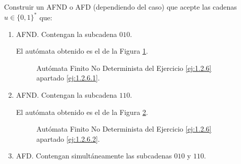 \begin{ejercicio} \label{ej:1.2.6}
    Construir un AFND o AFD (dependiendo del caso) que acepte las cadenas $u \in \{0, 1\}^*$ que:
    \begin{enumerate}
        \item AFND. Contengan la subcadena $010$. \label{ej:1.2.6.1}
        
        El autómata obtenido es el de la Figura \ref{fig:ej:1.2.6.1}.
        \begin{figure}[H]
            \centering
            \caption{Autómata Finito No Determinista del Ejercicio \ref{ej:1.2.6} apartado \ref{ej:1.2.6.1}.}
            \label{fig:ej:1.2.6.1}
        \end{figure}
        \item AFND. Contengan la subcadena $110$. \label{ej:1.2.6.2}
        
        El autómata obtenido es el de la Figura \ref{fig:ej:1.2.6.2}.
        \begin{figure}[H]
            \centering
            \caption{Autómata Finito No Determinista del Ejercicio \ref{ej:1.2.6} apartado \ref{ej:1.2.6.2}.}
            \label{fig:ej:1.2.6.2}
        \end{figure}
        \item AFD. Contengan simultáneamente las subcadenas $010$ y $110$. \label{ej:1.2.6.3}
        

\end{enumerate}
\end{ejercicio}
